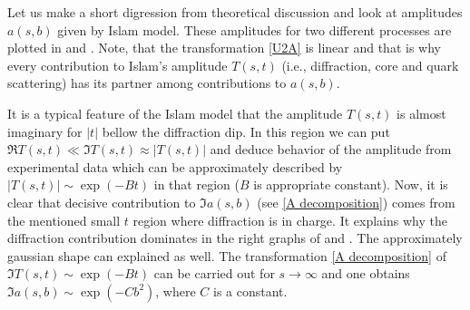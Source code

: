 Let us make a short digression from theoretical discussion and look at amplitudes $a(s, b)$ given by Islam model. These amplitudes for two different processes are plotted in \fgs{}  and . Note, that the transformation \ref{U2A} is linear and that is why every contribution to Islam's amplitude $T(s, t)$ (i.e., diffraction, core and quark scattering) has its partner among contributions to $a(s, b)$.

%
\emfig
\vfil
\vskip0pt
%
\emfig

It is a typical feature of the Islam model that the amplitude $T(s, t)$ is almost imaginary for $|t|$ bellow the diffraction dip. In this region we can put $\Re T(s, t) \ll \Im T(s, t) \approx |T(s, t)|$ and deduce behavior of the amplitude from experimental data which can be approximately described by $|T(s, t)| \sim \exp(-Bt)$ in that region ($B$ is appropriate constant). Now, it is clear that decisive contribution to $\Im a(s, b)$ (see \equ{} \ref{A decomposition}) comes from the mentioned small $t$ region where diffraction is in charge. It explains why the diffraction contribution dominates in the right graphs of \fgs{}  and . The approximately gaussian shape can explained as well. The transformation \ref{A decomposition} of $\Im T(s, t) \sim \exp(-Bt)$ can be carried out for $s\to\infty$ and one obtains $\Im a(s, b) \sim \exp(-C b^2)$, where $C$ is a constant.

